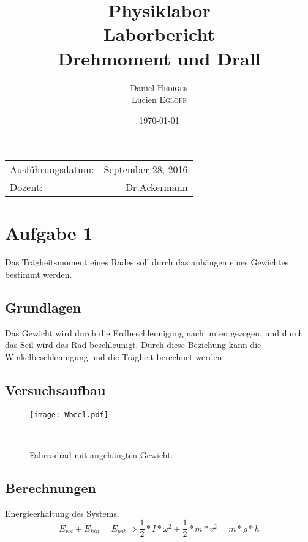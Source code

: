 \documentclass{article}
\title{Physiklabor \\ Laborbericht \\ Drehmoment und Drall} %
\author{Daniel \textsc{Hediger} \\ Lucien \textsc{Egloff}} %
\date{\today} %
\begin{document}
\maketitle %

\begin{center}
\begin{tabular}{l r}
Ausführungsdatum: & September 28, 2016 \\ %
Dozent: & Dr.Ackermann %
\end{tabular}
\end{center}
\newpage
\tableofcontents 

\newpage
\section{Aufgabe 1}


Das Trägheitsmoment eines Rades soll durch das anhängen eines Gewichtes bestimmt werden.

\subsection{Grundlagen}

Das Gewicht wird durch die Erdbeschleunigung nach unten gezogen, und durch das Seil wird das Rad beschleunigt. Durch diese Beziehung kann die Winkelbeschleunigung und die Trägheit berechnet werden.

\subsection{Versuchsaufbau}
\begin{figure}[h]
\center

\texttt{[image: Wheel.pdf]} 
\caption{Fahrradrad mit angehängten Gewicht.}
\
\end{figure}

\subsection{Berechnungen}
Energieerhaltung des Systems.\begin{equation}
E_{rot}+E_{kin}=E_{pot}  \Rightarrow\frac{1}{2}*I*\omega^2+\frac{1}{2}*m*v^2=m*g*h
\end{equation}
\end{document}
